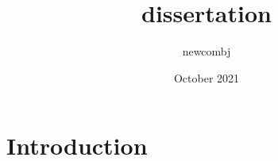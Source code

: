 \documentclass{article}
\title{dissertation}
\author{newcombj }
\date{October 2021}
\begin{document}
\maketitle

\section{Introduction}
\end{document}
